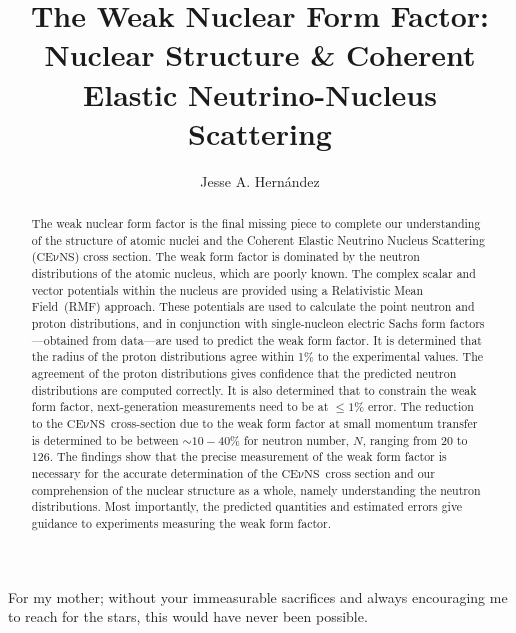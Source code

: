 \documentclass[12pt,expanded,copyright]{fsuthesis}
\title{The Weak Nuclear Form Factor:\protect\\ Nuclear Structure \& Coherent Elastic Neutrino-Nucleus Scattering}
\author{Jesse A. Hern\'{a}ndez}
\begin{document}
\frontmatter
\maketitle
\makecommitteepage
\newcommand{\cevns}{$\mathrm{CE\nu NS}$}
\newcommand{\gmu}{\gamma ^{\mu}}

\begin{dedication}
\centering
For my mother; without your immeasurable sacrifices and always encouraging me to reach for the stars, this would have never been possible.
\end{dedication}


 
\tableofcontents
\listoftables
\listoffigures



\begin{abstract}

The weak nuclear form factor is the final missing piece to complete our understanding of the structure of atomic nuclei and the Coherent Elastic Neutrino Nucleus Scattering (\cevns ) cross section. The weak form factor is dominated by the neutron distributions of the atomic nucleus, which are poorly known. The complex scalar and vector potentials within the nucleus are provided using a Relativistic Mean Field~(RMF) approach. These potentials are used to calculate the point neutron and proton distributions, and in conjunction with single-nucleon electric Sachs form factors---obtained from data---are used to predict the weak form factor. It is determined that the radius of the proton distributions agree within 1\% to the experimental values. The agreement of the proton distributions gives confidence that the predicted neutron distributions are computed correctly. It is also determined that to constrain the weak form factor, next-generation measurements need to be at $\leq 1\%$ error. The reduction to the \cevns\ cross-section due to the weak form factor at small momentum transfer is determined to be between $\sim 10-40 \%$ for neutron number, $N$, ranging from 20 to 126. The findings show that the precise measurement of the weak form factor is necessary for the accurate determination of the \cevns\ cross section and our comprehension of the nuclear structure as a whole, namely understanding the neutron distributions. Most importantly, the predicted quantities and estimated errors give guidance to experiments measuring the weak form factor. 

\end{abstract}
\end{document}
